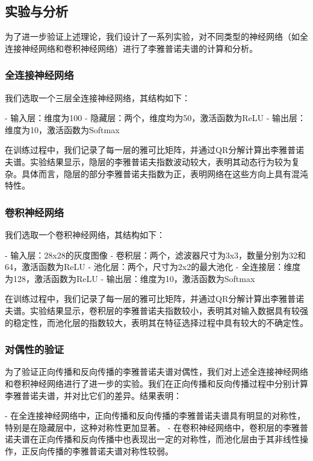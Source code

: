 \documentclass[12pt,a4paper]{amsart}
\begin{document}
\subsection{实验与分析}

为了进一步验证上述理论，我们设计了一系列实验，对不同类型的神经网络（如全连接神经网络和卷积神经网络）进行了李雅普诺夫谱的计算和分析。

\subsubsection{全连接神经网络}

我们选取一个三层全连接神经网络，其结构如下：

- 输入层：维度为100
- 隐藏层：两个，维度均为50，激活函数为ReLU
- 输出层：维度为10，激活函数为Softmax

在训练过程中，我们记录了每一层的雅可比矩阵，并通过QR分解计算出李雅普诺夫谱。实验结果显示，隐层的李雅普诺夫指数波动较大，表明其动态行为较为复杂。具体而言，隐层的部分李雅普诺夫指数为正，表明网络在这些方向上具有混沌特性。

\subsubsection{卷积神经网络}

我们选取一个卷积神经网络，其结构如下：

- 输入层：28x28的灰度图像
- 卷积层：两个，滤波器尺寸为3x3，数量分别为32和64，激活函数为ReLU
- 池化层：两个，尺寸为2x2的最大池化
- 全连接层：维度为128，激活函数为ReLU
- 输出层：维度为10，激活函数为Softmax

在训练过程中，我们记录了每一层的雅可比矩阵，并通过QR分解计算出李雅普诺夫谱。实验结果显示，卷积层的李雅普诺夫指数较小，表明其对输入数据具有较强的稳定性，而池化层的指数较大，表明其在特征选择过程中具有较大的不确定性。

\subsubsection{对偶性的验证}

为了验证正向传播和反向传播的李雅普诺夫谱对偶性，我们对上述全连接神经网络和卷积神经网络进行了进一步的实验。我们在正向传播和反向传播过程中分别计算李雅普诺夫谱，并对比它们的差异。结果表明：

- 在全连接神经网络中，正向传播和反向传播的李雅普诺夫谱具有明显的对称性，特别是在隐藏层中，这种对称性更加显著。
- 在卷积神经网络中，卷积层的李雅普诺夫谱在正向传播和反向传播中也表现出一定的对称性，而池化层由于其非线性操作，正反向传播的李雅普诺夫谱对称性较弱。
\end{document}
